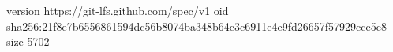 version https://git-lfs.github.com/spec/v1
oid sha256:21f8e7b6556861594dc56b8074ba348b64c3c6911e4e9fd26657f57929cce5c8
size 5702
